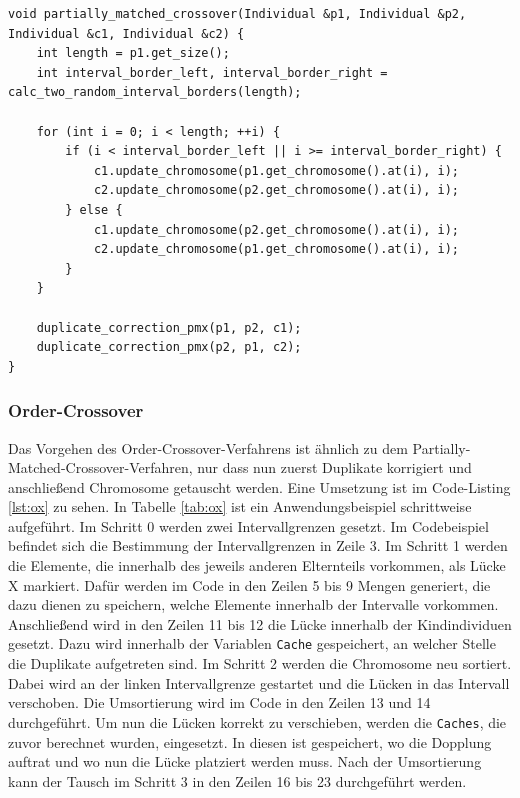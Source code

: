 \begin{minipage}[!htb]{\linewidth}
\begin{lstlisting}[caption={Partially-Matched-Crossover}, firstnumber=1, captionpos=b, label=lst:pmx]
void partially_matched_crossover(Individual &p1, Individual &p2, Individual &c1, Individual &c2) { 
	int length = p1.get_size();
	int interval_border_left, interval_border_right = calc_two_random_interval_borders(length);

	for (int i = 0; i < length; ++i) {
		if (i < interval_border_left || i >= interval_border_right) {
			c1.update_chromosome(p1.get_chromosome().at(i), i);
			c2.update_chromosome(p2.get_chromosome().at(i), i);
		} else {
			c1.update_chromosome(p2.get_chromosome().at(i), i);
			c2.update_chromosome(p1.get_chromosome().at(i), i);
		}
	}

	duplicate_correction_pmx(p1, p2, c1);
	duplicate_correction_pmx(p2, p1, c2);
}
\end{lstlisting}
\end{minipage}
\subsubsection{Order-Crossover}
Das Vorgehen des Order-Crossover-Verfahrens \cite[S. 274]{schoeneburg} ist ähnlich zu dem Partially-Matched-Crossover-Verfahren, nur dass nun zuerst Duplikate korrigiert und anschließend Chromosome getauscht werden.
Eine Umsetzung ist im Code-Listing \ref{lst:ox} zu sehen. In Tabelle \ref{tab:ox} ist ein Anwendungsbeispiel schrittweise aufgeführt. Im Schritt 0 werden zwei Intervallgrenzen gesetzt. Im Codebeispiel befindet sich die Bestimmung der Intervallgrenzen in Zeile 3.
Im Schritt 1 werden die Elemente, die innerhalb des jeweils anderen Elternteils vorkommen, als Lücke X markiert. Dafür werden im Code in den Zeilen 5 bis 9 Mengen generiert, die dazu dienen zu speichern, welche Elemente innerhalb der Intervalle vorkommen.
Anschließend wird in den Zeilen 11 bis 12 die Lücke innerhalb der Kindindividuen gesetzt. Dazu wird innerhalb der Variablen \texttt{Cache} gespeichert, an welcher Stelle die Duplikate aufgetreten sind. Im Schritt 2 werden die Chromosome neu sortiert. Dabei wird an der linken Intervallgrenze gestartet und die Lücken in das Intervall verschoben. Die Umsortierung wird im Code in den Zeilen 13 und 14 durchgeführt. Um nun die Lücken korrekt zu verschieben, werden die \texttt{Caches}, die zuvor berechnet wurden, eingesetzt. In diesen ist gespeichert, wo die Dopplung auftrat und wo nun die Lücke platziert werden muss.
Nach der Umsortierung kann der Tausch im Schritt 3 in den Zeilen 16 bis 23 durchgeführt werden.


